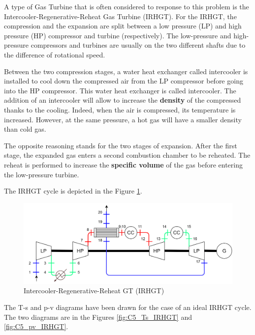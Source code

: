 A type of Gas Turbine that is often considered to response to this problem is the Intercooler-Regenerative-Reheat Gas Turbine (IRHGT). For the IRHGT, the compression and the expansion are split between a low pressure (LP) and high pressure (HP) compressor and turbine (respectively). The low-pressure and high-pressure compressors and turbines are usually on the two different shafts due to the difference of rotational speed.  

Between the two compression stages, a water heat exchanger called intercooler is installed to cool down the compressed air from the LP compressor before going into the HP compressor. This water heat exchanger is called intercooler. The addition of an intercooler will allow to increase the \textbf{density} of the compressed thanks to the cooling. Indeed, when the air is compressed, its temperature is increased. However, at the same pressure, a hot gas will have a smaller density than cold gas. 

The opposite reasoning stands for the two stages of expansion. After the first stage, the expanded gas enters a second combustion chamber to be reheated. The reheat is performed to increase the \textbf{specific volume} of the gas before entering the low-pressure turbine. 

The IRHGT cycle is depicted in the Figure \ref{fig:C5_IRHGT}.

\begin{figure}[h]
\centering
\includegraphics[width=1\textwidth]{IRHGT}
\caption{Intercooler-Regenerative-Reheat GT (IRHGT)}
\label{fig:C5_IRHGT}
\end{figure}

The T-s and p-v diagrams have been drawn for the case of an ideal IRHGT cycle. The two diagrams are in the Figures \ref{fig:C5_Ts_IRHGT} and \ref{fig:C5_pv_IRHGT}.

